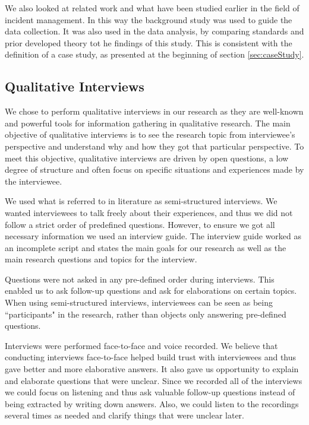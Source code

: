 We also looked at related work and what have been studied earlier in the field of incident management. In this way the background study was used to guide the data collection. It was also used in the data analysis, by comparing standards and prior developed theory tot he findings of this study. This is consistent with the definition of a case study, as presented at the beginning of section \ref{sec:caseStudy}.

\subsection{Qualitative Interviews}
\label{sec:interviews}
We chose to perform qualitative interviews in our research as they are well-known and powerful tools for information gathering in qualitative research\cite{myers2007qualitative}. The main objective of qualitative interviews is to see the research topic from interviewee's perspective and understand why and how they got that particular perspective\cite{cassell2004essential}. To meet this objective, qualitative interviews are driven by open questions, a low degree of structure and often focus on specific situations and experiences made by the interviewee. 

We used what is referred to in literature as semi-structured interviews\cite{cassell2004essential}. We wanted interviewees to talk freely about their experiences, and thus we did not follow a strict order of predefined questions. However, to ensure we got all necessary information we used an interview guide. The interview guide worked as an incomplete script and states the main goals for our research as well as the main research questions and topics for the interview.

Questions were not asked in any pre-defined order during interviews. This enabled us to ask follow-up questions and ask for elaborations on certain topics. When using semi-structured interviews, interviewees can be seen as being ``participants" in the research, rather than objects only answering pre-defined questions.

Interviews were performed face-to-face and voice recorded. We believe that conducting interviews face-to-face helped build trust with interviewees and thus gave better and more elaborative answers. It also gave us opportunity to explain and elaborate questions that were unclear. Since we recorded all of the interviews we could focus on listening and thus ask valuable follow-up questions instead of being extracted by writing down answers. Also, we could listen to the recordings several times as needed and clarify things that were unclear later.

